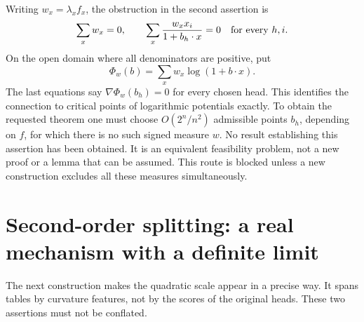 \documentclass[11pt]{article}
\begin{document}
Writing $w_x=\lambda_x f_x$, the obstruction in the second assertion is
\[
 \sum_xw_x=0,\qquad
 \sum_x\frac{w_xx_i}{1+b_h\cdot x}=0\quad\hbox{for every }h,i.
\]
On the open domain where all denominators are positive, put
\[
 \Phi_w(b)=\sum_xw_x\log(1+b\cdot x).
\]
The last equations say $\nabla\Phi_w(b_h)=0$ for every chosen head.
This identifies the connection to critical points of logarithmic
potentials exactly. To obtain the requested theorem one must choose
$O(2^n/n^2)$ admissible points $b_h$, depending on $f$, for which there
is no such signed measure $w$. No result establishing this assertion
has been obtained. It is an equivalent feasibility problem, not a new
proof or a lemma that can be assumed. This route is blocked unless a
new construction excludes all these measures simultaneously.

\section{Second-order splitting: a real mechanism with a definite limit}

The next construction makes the quadratic scale appear in a precise way.
It spans tables by curvature features, not by the scores of the original
heads. These two assertions must not be conflated.
\end{document}
